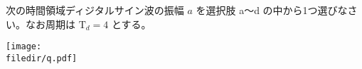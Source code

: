 次の時間領域ディジタルサイン波の振幅 $a$ を選択肢 a〜d の中から1つ選びなさい。なお周期は $\textrm{T}_d = 4$ とする。

\centering\texttt{[image: \\filedir/q.pdf]}

